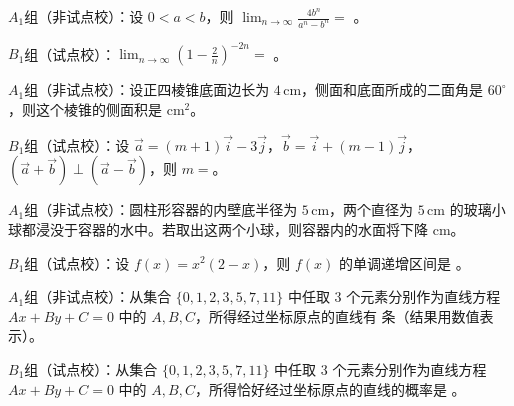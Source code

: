 \begin{question}

$A_1$组（非试点校）：设 $0<a<b$，则 $\displaystyle\lim_{n\to\infty}\frac{4b^n}{a^n-b^n}=$ \gkblank{}。

$B_1$组（试点校）：$\displaystyle\lim_{n\to\infty}\left(1-\frac2n\right)^{-2n}=$ \gkblank{}。

\end{question}
\begin{question}

$A_1$组（非试点校）：设正四棱锥底面边长为 $4\,\mathrm{cm}$，侧面和底面所成的二面角是 $60^\circ$，则这个棱锥的侧面积是 \gkblank{} $\mathrm{cm}^2$。

$B_1$组（试点校）：设 $\vec a=(m+1)\vec i-3\vec j$，$\vec b=\vec i+(m-1)\vec j$，$(\vec a+\vec b)\perp(\vec a-\vec b)$，则 $m=$\gkblank{}。

\end{question}
\begin{question}

$A_1$组（非试点校）：圆柱形容器的内壁底半径为 $5\,\mathrm{cm}$，两个直径为 $5\,\mathrm{cm}$ 的玻璃小球都浸没于容器的水中。若取出这两个小球，则容器内的水面将下降 \gkblank{} $\mathrm{cm}$。

$B_1$组（试点校）：设 $f(x)=x^2(2-x)$，则 $f(x)$ 的单调递增区间是 \gkblank{}。

\end{question}
\begin{question}

$A_1$组（非试点校）：从集合 $\{0,1,2,3,5,7,11\}$ 中任取 3 个元素分别作为直线方程 $Ax+By+C=0$ 中的 $A,B,C$，所得经过坐标原点的直线有 \gkblank{} 条（结果用数值表示）。

$B_1$组（试点校）：从集合 $\{0,1,2,3,5,7,11\}$ 中任取 3 个元素分别作为直线方程 $Ax+By+C=0$ 中的 $A,B,C$，所得恰好经过坐标原点的直线的概率是 \gkblank{}。

\end{question}

